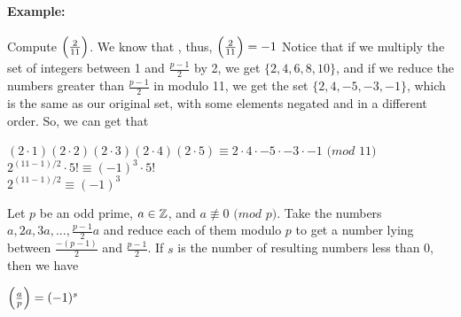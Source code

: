 \documentclass[../main.tex]{subfiles}
\begin{document}
\paragraph{Example:} Compute $\Big(\frac{2}{11}\Big)$. We know that , thus, $\Big(\frac{2}{11}\Big)=-1$
Notice that if we multiply the set of integers between 1 and $\tfrac{p-1}{2}$ by 2, we get $\{2,4,6,8,10\}$, and if we reduce the numbers greater than $\tfrac{p-1}{2}$ in modulo 11, we get the set $\{2,4,-5,-3, -1\}$, which is the same as our original set, with some elements negated and in a different order. So, we can get that 
\begin{center}
    $(2\cdot1)(2\cdot2)(2\cdot3)(2\cdot4)(2\cdot5) \equiv 2\cdot4\cdot-5\cdot-3\cdot-1$ $(mod$ $11)$ \\
    $2^{(11-1)/2}\cdot 5! \equiv (-1)^3\cdot5!$ \\
    $2^{(11-1)/2} \equiv (-1)^3$
\end{center}
\begin{thm}
    Let $p$ be an odd prime, $a \in \mathbb{Z}$, and $a \not\equiv 0$ $(mod$ $p)$. Take the numbers $a,2a,3a,...,\tfrac{p-1}{2}a$ and reduce each of them modulo $p$ to get a number lying between $\tfrac{-(p-1)}{2}$ and $\tfrac{p-1}{2}$. If $s$ is the number of resulting numbers less than 0, then we have \\
    \centerline{$\Big(\frac{a}{p}\Big)=(-1)^s$}
\end{thm}
\end{document}
